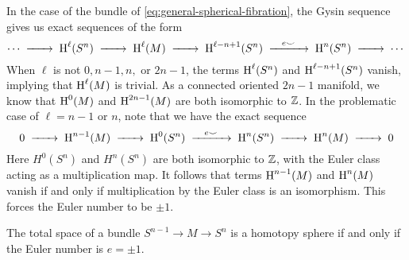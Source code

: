 In the case of the bundle of \cref{eq:general-spherical-fibration}, the Gysin sequence gives us exact sequences of the form
\[
	\cdots \lkxto \H^\ell(S^n) \lkxto \H^{\ell}(M) \lkxto \H^{\ell - n+1}(S^n) \lkxto[e\smile] \H^n(S^n) \lkxto \cdots
\]
When $\ell$ is not $0,n-1,n,$ or $2n-1$, the terms $\operatorname{H}^\ell(S^n)$ and $\operatorname{H}^{\ell - n+1}(S^n)$ vanish, implying that $\operatorname{H}^\ell(M)$ is trivial. As a connected oriented $2n-1$ manifold, we know that $\operatorname{H}^0(M)$ and $\operatorname{H}^{2n-1}(M)$ are both isomorphic to $\mathbb{Z}$. In the problematic case of $\ell = n-1$ or $n$, note that we have the exact sequence
\[
	0 \lkxto \H^{n-1}(M) \lkxto \H^0(S^n) \lkxto[e\smile] \H^n(S^n) \lkxto \H^n(M) \lkxto 0
\]
Here $H^0(S^n)$ and $H^n(S^n)$ are both isomorphic to $\mathbb{Z}$, with the Euler class acting as a multiplication map. It follows that terms $\operatorname{H}^{n-1}(M)$ and $\operatorname{H}^n(M)$ vanish if and only if multiplication by the Euler class is an isomorphism. This forces the Euler number to be $\pm 1$.

\begin{proposition}\label{prop:homotopy-type-spherical-bundle}
	The total space of a bundle $S^{n-1} \to M \to S^n$ is a homotopy sphere if and only if the Euler number is $e=\pm 1$.
\end{proposition}


